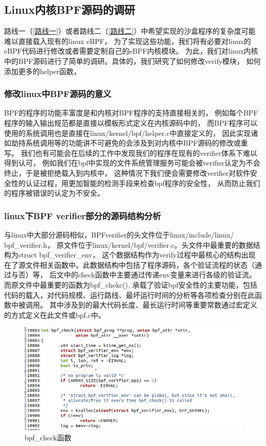 \documentclass[AutoFakeBold,a4paper]{ctexart}
\begin{document}
\subsection{Linux内核BPF源码的调研}
路线一（\ref{路线一}）或者路线二（\ref{路线二}）中希望实现的沙盒程序的复杂度可能难以直接载入现有的linux eBPF，
为了实现这些功能，我们将有必要对linux的eBPF代码进行修改或者需要定制自己的eBPF内核模块。
为此，我们对linux内核中的BPF源码进行了简单的调研。具体的，我们研究了如何修改verify模块，
如何添加更多的helper函数，
\subsubsection{修改linux中BPF源码的意义}
BPF的程序的功能丰富度是和内核对BPF程序的支持直接相关的，
例如每个BPF程序的输入输出规范都是直接以模板形式定义在内核源码中的，
而BPF程序可以使用的系统调用也是直接在{\ttfamily linux/kernel/bpf/helper.c}中直接定义的，
因此实现诸如劫持系统调用等的功能讲不可避免的会涉及到对内核中BPF源码的修改或重写。
我们也有可能会在后续的工作中发现我们的程序在现有的verifier体系下难以得到认可，
例如我们在bpf中实现的文件系统管理服务可能会被verifier认定为不会终止，于是被拒绝载入到内核中，
这种情况下我们便会需要修改verifier对软件安全性的认证过程，用更加智能的检测手段来检查bpf程序的安全性，
从而防止我们的程序被错误的认定为不安全。
\subsubsection{linux下BPF verifier部分的源码结构分析}
与linux中大部分源码相似，BPFverifier的头文件位于{\ttfamily linux/include/linux/\\bpf\_verifier.h}，
原文件位于{\ttfamily linux/kernel/bpf/verifier.c}。头文件中最重要的数据结构为{\ttfamily struct bpf\_verifier\_env}，
这个数据结构作为verify过程中最核心的结构出现在了源文件相关函数中。此数据结构中包括了程序源码，各个验证流程的状态（通过与否）等，
后文中的{\ttfamily check}函数中主要通过传递{\ttfamily env}变量来进行各级的验证流。而原文件中最重要的函数为{\ttfamily bpf\_chekc()},
承载了验证bpf安全性的主要功能，包括代码的载入，对代码规模、运行路线、最坏运行时间的分析等各项检查分别在此函数中被调用。
其中涉及到的最大代码长度、最长运行时间等重要常数通过宏定义的方式定义在此文件或{\ttfamily bpf.c}中。
\begin{figure}[H]
    \centering
    \includegraphics[width=0.9\columnwidth]{pic_2.jpg}
    \caption{{\ttfamily bpf\_check}函数}
\end{figure}
\end{document}
